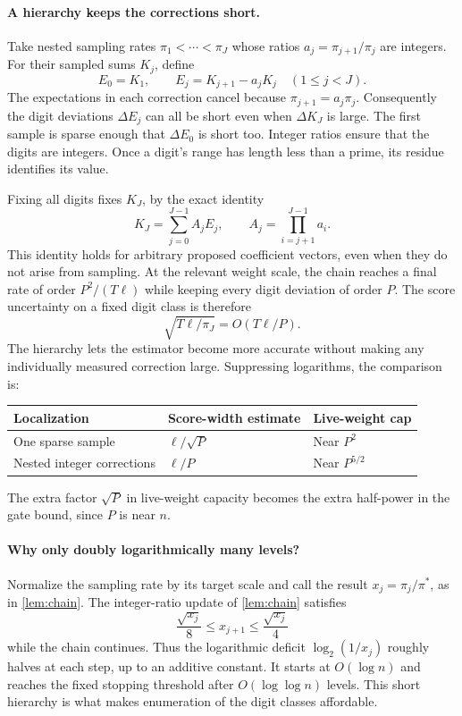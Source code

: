 \documentclass[11pt,letterpaper]{article}
\theoremstyle{definition}
\theoremstyle{remark}
\begin{document}
\paragraph{A hierarchy keeps the corrections short.}
Take nested sampling rates \(\pi_1<\cdots<\pi_J\) whose ratios
\(a_j=\pi_{j+1}/\pi_j\) are integers. For their sampled sums
\(K_j\), define
\[
 E_0=K_1,\qquad E_j=K_{j+1}-a_jK_j\quad(1\le j<J).
\]
The expectations in each correction cancel because
\(\pi_{j+1}=a_j\pi_j\). Consequently the digit deviations
\(\Delta E_j\) can all be short even when \(\Delta K_J\) is large.
The first sample is sparse enough that \(\Delta E_0\) is short too.
Integer ratios ensure that the digits are integers. Once a digit's
range has length less than a prime, its residue identifies its value.

Fixing all digits fixes \(K_J\), by the exact identity
\[
 K_J=\sum_{j=0}^{J-1}A_jE_j,
 \qquad A_j=\prod_{i=j+1}^{J-1}a_i.
\]
This identity holds for arbitrary proposed coefficient vectors, even
when they do not arise from sampling. At the relevant weight scale,
the chain reaches a final rate of order \(P^2/(T\ell)\) while
keeping every digit deviation of order \(P\). The score uncertainty
on a fixed digit class is therefore
\[
 \sqrt{T\ell/\pi_J}=O(T\ell/P).
\]
The hierarchy lets the estimator become more accurate without making
any individually measured correction large. Suppressing logarithms,
the comparison is:
\begin{center}\small
\begin{tabular}{@{}lll@{}}
\toprule
Localization & Score-width estimate & Live-weight cap\\
\midrule
One sparse sample & \(\ell/\sqrt P\) & Near \(P^2\)\\
Nested integer corrections & \(\ell/P\) & Near \(P^{5/2}\)\\
\bottomrule
\end{tabular}
\end{center}
The extra factor \(\sqrt P\) in live-weight capacity becomes the
extra half-power in the gate bound, since \(P\) is near \(n\).

\paragraph{Why only doubly logarithmically many levels?}
Normalize the sampling rate by its target scale and call the result
\(x_j=\pi_j/\pi^*\), as in \cref{lem:chain}. The integer-ratio update of
\cref{lem:chain} satisfies
\[
 \frac{\sqrt{x_j}}8\le x_{j+1}\le\frac{\sqrt{x_j}}4
\]
while the chain continues. Thus the logarithmic deficit
\(\log_2(1/x_j)\) roughly halves at each step, up to an additive
constant. It starts at \(O(\log n)\) and reaches the fixed stopping
threshold after \(O(\log\log n)\) levels. This short hierarchy is
what makes enumeration of the digit classes affordable.
\end{document}
